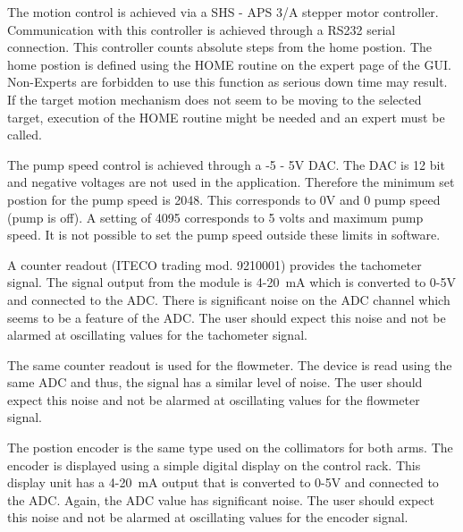 {The motion control is achieved via a SHS - APS 3/A stepper motor controller.
Communication with this controller is achieved through a RS232 serial
connection. This controller counts absolute steps from the home postion.
The home postion is defined using the HOME routine on the expert page
of the GUI. Non-Experts are forbidden to use this function as serious
down time may result. If the target motion mechanism does not seem
to be moving to the selected target, execution of the HOME routine
might be needed and an expert must be called.

The pump speed control is achieved through a -5 - 5V DAC. The DAC
is 12 bit and negative voltages are not used in the application. Therefore
the minimum set postion for the pump speed is 2048. This corresponds
to 0V and 0 pump speed (pump is off). A setting of 4095 corresponds
to 5 volts and maximum pump speed. It is not possible to set the pump
speed outside these limits in software.

A counter readout (ITECO trading mod. 9210001) provides the tachometer
signal. The signal output from the module is 4-20~mA which is converted
to 0-5V and connected to the ADC. There is significant noise on the
ADC channel which seems to be a feature of the ADC. The user should
expect this noise and not be alarmed at oscillating values for the
tachometer signal.

The same counter readout is used for the flowmeter. The device is
read using the same ADC and thus, the signal has a similar level of
noise. The user should expect this noise and not be alarmed at oscillating
values for the flowmeter signal.

The postion encoder is the same type used on the collimators for both
arms. The encoder is displayed using a simple digital display on the
control rack. This display unit has a 4-20~mA output that is converted
to 0-5V and connected to the ADC. Again, the ADC value has significant
noise. The user should expect this noise and not be alarmed at oscillating
values for the encoder signal.


}
